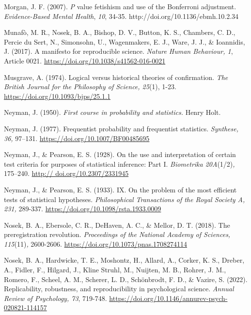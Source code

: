\documentclass[authordate, empirical]{jote-new-article}
\begin{document}
	Morgan, J. F. (2007). \emph{P} value fetishism and use of the Bonferroni adjustment. \emph{Evidence-Based Mental Health}, \emph{10}, 34-35. http://doi.org/10.1136/ebmh.10.2.34



	Munafò, M. R., Nosek, B. A., Bishop, D. V., Button, K. S., Chambers, C. D., Percie du Sert, N., Simonsohn, U., Wagenmakers, E. J., Ware, J. J., \& Ioannidis, J. (2017). A manifesto for reproducible science. \emph{Nature Human Behaviour, 1}, Article 0021. \href{https://doi.org/10.1038/s41562-016-0021}{https://doi.org/10.1038/s41562-016-0021}



	Musgrave, A. (1974). Logical versus historical theories of confirmation. \emph{The British Journal for the Philosophy of Science, 25}(1), 1-23. \href{https://doi.org/10.1093/bjps/25.1.1}{https://doi.org/10.1093/bjps/25.1.1}



	Neyman, J. (1950). \emph{First course in probability and statistics.} Henry Holt.



	Neyman, J. (1977). Frequentist probability and frequentist statistics. \emph{Synthese, 36,} 97--131. \href{https://doi.org/10.1007/BF00485695}{https://doi.org/10.1007/BF00485695}



	Neyman, J., \& Pearson, E. S. (1928). On the use and interpretation of certain test criteria for purposes of statistical inference: Part I. \emph{Biometrika 20}\emph{A}(1/2)\emph{,} 175--240. \href{http://dx.doi.org/10.2307/2331945}{http:// doi.org/10.2307/2331945}



	Neyman, J., \& Pearson, E. S. (1933). IX. On the problem of the most efficient tests of statistical hypotheses. \emph{Philosophical Transactions of the Royal Society A, 231,} 289-337. \href{https://doi.org/10.1098/rsta.1933.0009}{https://doi.org/10.1098/rsta.1933.0009}



	Nosek, B. A., Ebersole, C. R., DeHaven, A. C., \& Mellor, D. T. (2018). The preregistration revolution. \emph{Proceedings of the National Academy of Sciences, 115}(11)\emph{,} 2600-2606. \href{https://doi.org/10.1073/pnas.1708274114}{https://doi.org/10.1073/pnas.1708274114}



	Nosek, B. A., Hardwicke, T. E., Moshontz, H., Allard, A., Corker, K. S., Dreber, A., Fidler, F., Hilgard, J., Kline Struhl, M., Nuijten, M. B., Rohrer, J. M., Romero, F., Scheel, A. M., Scherer, L. D., Schönbrodt, F. D., \& Vazire, S. (2022). Replicability, robustness, and reproducibility in psychological science. \emph{Annual Review of Psychology, 73}, 719-748. \href{https://doi.org/10.1146/annurev-psych-020821-114157}{https://doi.org/10.1146/annurev-psych-020821-114157}
\end{document}
